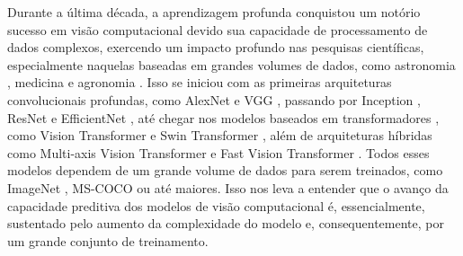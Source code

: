 Durante a última década, a aprendizagem profunda conquistou um notório sucesso em visão computacional devido sua capacidade de processamento de dados complexos, exercendo um impacto profundo nas pesquisas científicas, especialmente naquelas baseadas em grandes volumes de dados, como astronomia \citep{astro1, astro2}, medicina \citep{VGG16Ex03, InceptionResNetV2Ex03, InceptionResNetV2Ex02} e agronomia \citep{EfficientNetEx03, VGG16Ex02}. Isso se iniciou com as primeiras arquiteturas convolucionais profundas, como AlexNet \citep{alexnet-x} e VGG \citep{vgg16-x}, passando por Inception \citep{inception-x}, ResNet \citep{resnet-x} e EfficientNet \citep{efficientnet-x}, até chegar nos modelos baseados em transformadores \citep{transformers-x}, como Vision Transformer \citep{vit} e Swin Transformer \citep{swin}, além de arquiteturas híbridas como Multi-axis Vision Transformer \citep{maxvit} e Fast Vision Transformer \citep{fastvit}. Todos esses modelos dependem de um grande volume de dados para serem treinados, como ImageNet \citep{imagenet-x}, MS-COCO \citep{ms-coco} ou até maiores. Isso nos leva a entender que o avanço da capacidade preditiva dos modelos de visão computacional é, essencialmente, sustentado pelo aumento da complexidade do modelo e, consequentemente, por um grande conjunto de treinamento.



